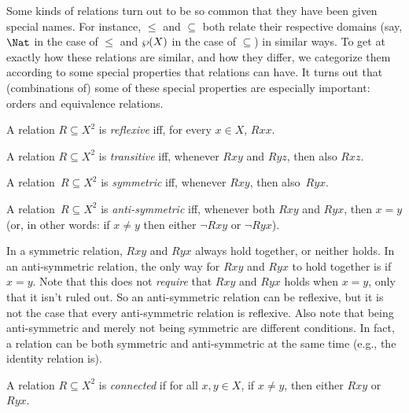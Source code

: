 \documentclass[../../include/open-logic-section]{subfiles}
\begin{document}

\begin{intro}
Some kinds of relations turn out to be so common that they have been
given special names.  For instance, $\le$ and $\subseteq$ both relate
their respective domains (say, $\Nat$ in the case of $\le$ and
$\wp(X)$ in the case of $\subseteq$) in similar ways.  To get at
exactly how these relations are similar, and how they differ, we
categorize them according to some special properties that relations
can have.  It turns out that (combinations of) some of these special
properties are especially important: orders and equivalence relations.
\end{intro}

\begin{defn}
A relation $R \subseteq X^2$ is \emph{reflexive} iff, for every $x \in
X$, $Rxx$.
\end{defn}

\begin{defn}
A relation $R \subseteq X^2$ is \emph{transitive} iff, whenever $Rxy$
and $Ryz$, then also $Rxz$.
\end{defn}

\begin{defn}
A relation~$R \subseteq X^2$ is \emph{symmetric} iff, whenever
$Rxy$, then also~$Ryx$.
\end{defn}

\begin{defn}
A relation~$R \subseteq X^2$ is \emph{anti-symmetric} iff, whenever both
$Rxy$ and $Ryx$, then $x=y$ (or, in other words: if $x\neq y$ then
either $\lnot Rxy$ or $\lnot Ryx$).
\end{defn}

\begin{explain}
In a symmetric relation, $Rxy$ and $Ryx$ always hold together, or
neither holds.  In an anti-symmetric relation, the only way for $Rxy$
and $Ryx$ to hold together is if $x = y$.  Note that this does not
\emph{require} that $Rxy$ and $Ryx$ holds when $x = y$, only that it
isn't ruled out.  So an anti-symmetric relation can be reflexive, but
it is not the case that every anti-symmetric relation is
reflexive.  Also note that being anti-symmetric and merely not being
symmetric are different conditions.  In fact, a relation can be both
symmetric and anti-symmetric at the same time (e.g., the identity
relation is).
\end{explain}

\begin{defn}
A relation $R \subseteq X^2$ is \emph{connected} if for all $x,y\in
X$, if $x \neq y$, then either $Rxy$ or~$Ryx$.
\end{defn}
\end{document}
